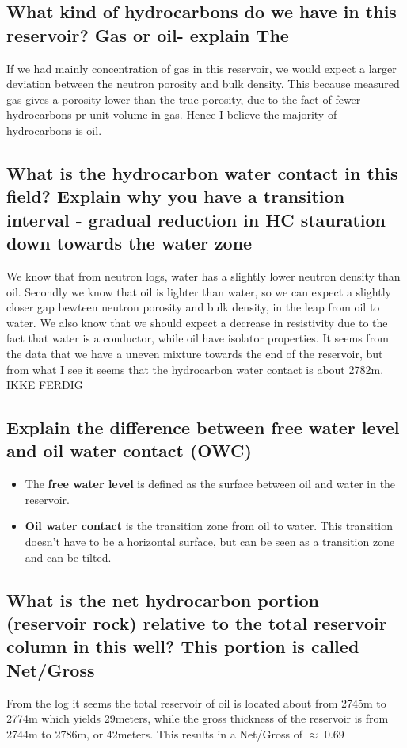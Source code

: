 \documentclass[a4paper,norsk]{article}
\begin{document}
\subsection*{What kind of hydrocarbons do we have in this reservoir? Gas or oil- explain The}
If we had mainly concentration of gas in this reservoir, we would expect a larger deviation between the neutron porosity and bulk density. This because measured gas gives a porosity lower than the true porosity, due to the fact of fewer hydrocarbons pr unit volume in gas. Hence I believe the majority of hydrocarbons is oil. 

\subsection*{What is the hydrocarbon water contact in this field? Explain why you have a transition interval - gradual reduction in HC stauration down towards the water zone}
We know that from neutron logs, water has a slightly lower neutron density than oil. Secondly we know that oil is lighter than water, so we can expect a slightly closer gap bewteen neutron porosity and bulk density, in the leap from oil to water. We also know that we should expect a decrease in resistivity due to the fact that water is a conductor, while oil have isolator properties. It seems from the data that we have a uneven mixture towards the end of the reservoir, but from what I see it seems that the hydrocarbon water contact is about 2782m. IKKE FERDIG

\subsection*{Explain the difference between free water level and oil water contact (OWC)}
\begin{itemize}
\item The \textbf{free water level} is defined as the surface between oil and water in the reservoir. 
\item \textbf{Oil water contact} is the transition zone from oil to water. This transition doesn't have to be a horizontal surface, but can be seen as a transition zone and can be tilted.
\end{itemize}

\subsection*{What is the net hydrocarbon portion (reservoir rock) relative to the total reservoir column in this well? This portion is called Net/Gross}
From the log it seems the total reservoir of oil is located about from 2745m to 2774m which yields 29meters, while the gross thickness of the reservoir is from 2744m to 2786m, or 42meters. This results in a Net/Gross of $\approx$ 0.69
\end{document}
